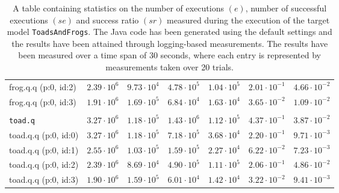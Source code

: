 \begin{table}[htbp]
{\begin{tabular}{lrrrrrr}
\hspace{3mm}frog.q.q (p:0, id:2)              & $2.39 \cdot 10^{6}$ & $9.73 \cdot 10^{4}$ & $4.78 \cdot 10^{5}$ & $1.04 \cdot 10^{5}$ & $2.01 \cdot 10^{-1}$ & $4.66 \cdot 10^{-2}$ \\
\hspace{3mm}frog.q.q (p:0, id:3)              & $1.91 \cdot 10^{6}$ & $1.69 \cdot 10^{5}$ & $6.84 \cdot 10^{4}$ & $1.63 \cdot 10^{4}$ & $3.65 \cdot 10^{-2}$ & $1.09 \cdot 10^{-2}$ \\
\\[-8pt]\texttt{toad.q}                       & $3.27 \cdot 10^{6}$ & $1.18 \cdot 10^{5}$ & $1.43 \cdot 10^{6}$ & $1.12 \cdot 10^{5}$ & $4.37 \cdot 10^{-1}$ & $3.87 \cdot 10^{-2}$ \\
\hspace{3mm}toad.q.q (p:0, id:0)              & $3.27 \cdot 10^{6}$ & $1.18 \cdot 10^{5}$ & $7.18 \cdot 10^{5}$ & $3.68 \cdot 10^{4}$ & $2.20 \cdot 10^{-1}$ & $9.71 \cdot 10^{-3}$ \\
\hspace{3mm}toad.q.q (p:0, id:1)              & $2.55 \cdot 10^{6}$ & $1.03 \cdot 10^{5}$ & $1.59 \cdot 10^{5}$ & $2.27 \cdot 10^{4}$ & $6.22 \cdot 10^{-2}$ & $7.23 \cdot 10^{-3}$ \\
\hspace{3mm}toad.q.q (p:0, id:2)              & $2.39 \cdot 10^{6}$ & $8.69 \cdot 10^{4}$ & $4.90 \cdot 10^{5}$ & $1.11 \cdot 10^{5}$ & $2.06 \cdot 10^{-1}$ & $4.86 \cdot 10^{-2}$ \\
\hspace{3mm}toad.q.q (p:0, id:3)              & $1.90 \cdot 10^{6}$ & $1.59 \cdot 10^{5}$ & $6.01 \cdot 10^{4}$ & $1.42 \cdot 10^{4}$ & $3.22 \cdot 10^{-2}$ & $9.41 \cdot 10^{-3}$ \\
\bottomrule
\end{tabular}
}
\caption{A table containing statistics on the number of executions $(e)$, number of successful executions $(se)$ and success ratio $(sr)$ measured during the execution of the target model \texttt{ToadsAndFrogs}. The Java code has been generated using the default settings and the results have been attained through logging-based measurements. The results have been measured over a time span of 30 seconds, where each entry is represented by measurements taken over 20 trials.}
\label{table:frequency_results_toadsandfrogs_logging}
\end{table}